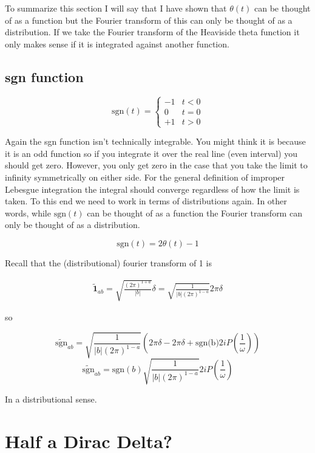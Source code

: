 \documentclass[12pt]{article}
\begin{document}
To summarize this section I will say that I have shown that $\theta(t)$ can be thought of as a function but the Fourier transform of this can only be thought of as a distribution. If we take the Fourier transform of the Heaviside theta function it only makes sense if it is integrated against another function.


\subsection{sgn function}

\[ \text{sgn}(t) = \begin{cases} 
      -1 & t < 0 \\
      0 & t=0 \\
      +1 & t > 0 
   \end{cases}
\]

Again the sgn function isn't technically integrable. You might think it is because it is an odd function so if you integrate it over the real line (even interval) you should get zero. However, you only get zero in the case that you take the limit to infinity symmetrically on either side. For the general definition of improper Lebesgue integration the integral should converge regardless of how the limit is taken. To this end we need to work in terms of distributions again. In other words, while $\text{sgn}(t)$ can be thought of as a function the Fourier transform can only be thought of as a distribution.

\[
\text{sgn}(t) = 2\theta(t) - 1
\]

Recall that the (distributional) fourier transform of 1 is

\begin{align}
\tilde{\mathbf{1}}_{ab} = \sqrt{\frac{(2\pi)^{1+a}}{|b|}} \delta = \sqrt{\frac{1}{|b|(2\pi)^{1-a}}} 2\pi \delta
\end{align}

so

\[
\widetilde{\text{sgn}}_{ab} = \sqrt{\frac{1}{|b|(2\pi)^{1-a}}}\left(2\pi\delta-2\pi\delta+ \text{sgn(b)}2iP\left(\frac{1}{\omega}\right)\right)
\]
\[
\widetilde{\text{sgn}}_{ab} = \text{sgn}(b)\sqrt{\frac{1}{|b|(2\pi)^{1-a}}} 2i P\left(\frac{1}{\omega}\right)
\]

In a distributional sense.

\section{Half a Dirac Delta?}
\end{document}
